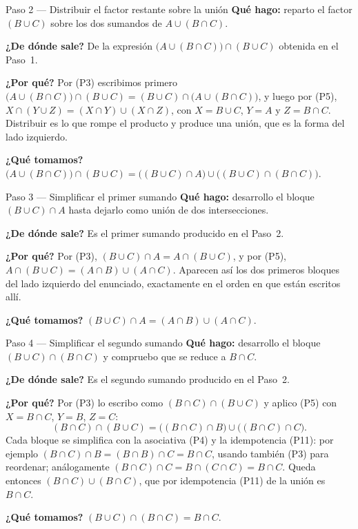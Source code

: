 \documentclass[11pt]{article}
\begin{document}
\begin{paso}{Paso 2 --- Distribuir el factor restante sobre la unión}
\textbf{Qué hago:} reparto el factor $(B\cup C)$ sobre los dos sumandos de $A\cup(B\cap C)$.

\textbf{¿De dónde sale?} De la expresión $\bigl(A\cup(B\cap C)\bigr)\cap(B\cup C)$ obtenida en el
Paso~1.

\textbf{¿Por qué?} Por (P3) escribimos primero $\bigl(A\cup(B\cap C)\bigr)\cap(B\cup C)
=(B\cup C)\cap\bigl(A\cup(B\cap C)\bigr)$, y luego por (P5),
$X\cap(Y\cup Z)=(X\cap Y)\cup(X\cap Z)$, con $X=B\cup C$, $Y=A$ y $Z=B\cap C$. Distribuir es lo
que rompe el producto y produce una unión, que es la forma del lado izquierdo.

\textbf{¿Qué tomamos?}
$\bigl(A\cup(B\cap C)\bigr)\cap(B\cup C)=\bigl((B\cup C)\cap A\bigr)\cup\bigl((B\cup C)\cap(B\cap C)\bigr)$.
\end{paso}

\begin{paso}{Paso 3 --- Simplificar el primer sumando}
\textbf{Qué hago:} desarrollo el bloque $(B\cup C)\cap A$ hasta dejarlo como unión de dos
intersecciones.

\textbf{¿De dónde sale?} Es el primer sumando producido en el Paso~2.

\textbf{¿Por qué?} Por (P3), $(B\cup C)\cap A=A\cap(B\cup C)$, y por (P5),
$A\cap(B\cup C)=(A\cap B)\cup(A\cap C)$. Aparecen así los dos primeros bloques del lado
izquierdo del enunciado, exactamente en el orden en que están escritos allí.

\textbf{¿Qué tomamos?} $(B\cup C)\cap A=(A\cap B)\cup(A\cap C)$.
\end{paso}

\begin{paso}{Paso 4 --- Simplificar el segundo sumando}
\textbf{Qué hago:} desarrollo el bloque $(B\cup C)\cap(B\cap C)$ y compruebo que se reduce a
$B\cap C$.

\textbf{¿De dónde sale?} Es el segundo sumando producido en el Paso~2.

\textbf{¿Por qué?} Por (P3) lo escribo como $(B\cap C)\cap(B\cup C)$ y aplico (P5) con
$X=B\cap C$, $Y=B$, $Z=C$:
\[
(B\cap C)\cap(B\cup C)=\bigl((B\cap C)\cap B\bigr)\cup\bigl((B\cap C)\cap C\bigr).
\]
Cada bloque se simplifica con la asociativa (P4) y la idempotencia (P11): por ejemplo
$(B\cap C)\cap B=(B\cap B)\cap C=B\cap C$, usando también (P3) para reordenar; análogamente
$(B\cap C)\cap C=B\cap(C\cap C)=B\cap C$. Queda entonces $(B\cap C)\cup(B\cap C)$, que por
idempotencia (P11) de la unión es $B\cap C$.

\textbf{¿Qué tomamos?} $(B\cup C)\cap(B\cap C)=B\cap C$.
\end{paso}
\end{document}

